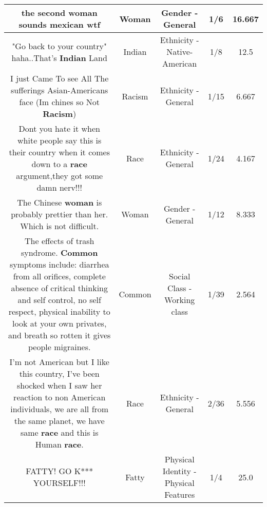 \documentclass[11pt]{article}
\newlength\mylength
\begin{document}
\begin{center}
\begin{longtable}{|C{.65\mylength}|C{.30\mylength}|C{.12\mylength}|C{.12\mylength}|C{.12\mylength}|}
  \small the second \textbf{woman} sounds mexican wtf\normalsize   & Woman & Gender - General & 1/6 & 16.667 \\  \hline
  \small "Go back to your country" haha..That's \textbf{Indian} Land\normalsize   & Indian & Ethnicity - Native-American & 1/8 & 12.5 \\  \hline
  \small I just Came To see All The sufferings Asian-Americans face (Im chines so Not \textbf{Racism})\normalsize   & Racism & Ethnicity - General & 1/15 & 6.667 \\  \hline
  \small Dont you hate it when white people say this is their country when it comes down to a \textbf{race} argument,they got some damn nerv!!!\normalsize   & Race & Ethnicity - General & 1/24 & 4.167 \\  \hline
  \small The Chinese \textbf{woman} is probably prettier than her. Which is not difficult.\normalsize   & Woman & Gender - General & 1/12 & 8.333 \\  \hline
  \small The effects of trash syndrome. \textbf{Common} symptoms include: diarrhea from all orifices, complete absence of critical thinking and self control, no self respect, physical inability to look at your own privates, and breath so rotten it gives people migraines.\normalsize   & Common & Social Class - Working class & 1/39 & 2.564 \\  \hline
  \small I'm not American but I like this country, I've been shocked when I saw her reaction to non American individuals, we are all from the same planet, we have same \textbf{race} and this is Human \textbf{race}.\normalsize   & Race & Ethnicity - General & 2/36 & 5.556 \\  \hline
  \small FATTY! GO K*** YOURSELF!!!\normalsize   & Fatty & Physical Identity - Physical Features & 1/4 & 25.0 \\  \hline

\end{longtable}
\end{center}
\end{document}
